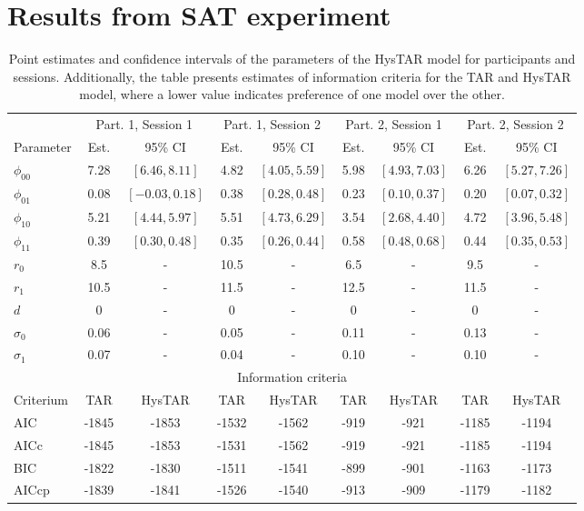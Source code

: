 \documentclass{article}
\begin{document}
\section{Results from SAT experiment}
\label{app:results_SAT}

\begin{table}[h!]
\begin{center}
\begin{tabular}{ l  c c  c c c c c c }
\hline
 & 
 \multicolumn{2}{c}{Part. 1, Session 1} 
 & \multicolumn{2}{c}{Part. 1, Session 2} 
 & \multicolumn{2}{c}{Part. 2, Session 1} 
 & \multicolumn{2}{c}{Part. 2, Session 2} \\
 \cline{2-9}
Parameter 
& Est. & 95\% CI 
& Est. & 95\% CI 
& Est. & 95\% CI 
& Est. & 95\% CI \\ 
\hline
$\phi_{00}$ 
& 7.28 & $[6.46, 8.11]$ 
& 4.82 & $[4.05, 5.59]$ 
& 5.98 & $[4.93, 7.03]$
& 6.26 & $[5.27, 7.26]$ \\
$\phi_{01}$ 
& 0.08 & $[-0.03, 0.18]$ 
& 0.38 & $[0.28, 0.48]$
& 0.23 & $[0.10, 0.37]$
& 0.20 & $[0.07, 0.32]$ \\
$\phi_{10}$ 
& 5.21 & $[4.44, 5.97]$ 
& 5.51 & $[4.73, 6.29]$
& 3.54 & $[2.68, 4.40]$
& 4.72 & $[3.96, 5.48]$ \\
$\phi_{11}$ 
& 0.39 & $[0.30, 0.48]$ 
& 0.35 & $[0.26, 0.44]$
& 0.58 & $[0.48, 0.68]$
& 0.44 & $[0.35, 0.53]$ \\
$r_0$ 
& 8.5 & - 
& 10.5 & -  
& 6.5 & -  
& 9.5 & - \\
$r_1$ 
& 10.5 & - 
& 11.5 & -
& 12.5 & -
& 11.5 & - \\
$d$ 
& 0 & - 
& 0 & -
& 0 & -
& 0 & -\\
$\sigma_0$ 
& 0.06 & - 
& 0.05 & -
& 0.11 & -
& 0.13 & - \\
$\sigma_1$ 
& 0.07 & - 
& 0.04 & - 
& 0.10 & - 
& 0.10 & - \\
\multicolumn{9}{c}{Information criteria} \\
\hline
Criterium 	& TAR 	& HysTAR 	& TAR 	& HysTAR 	& TAR 	& HysTAR 	& TAR 	& HysTAR \\
\hline
AIC 			& -1845 	& -1853 		& -1532 	& -1562 	 	& -919	& -921		& -1185	& -1194  \\
AICc 		& -1845 	& -1853 		& -1531 	& -1562 		& -919	& -921		& -1185	& -1194  \\
BIC 			& -1822 	& -1830 		& -1511	& -1541		& -899	& -901		& -1163 & -1173  \\
AICcp 		& -1839 	& -1841 		& -1526 	& -1540 	 	& -913	& -909		& -1179	& -1182  \\
\hline
\end{tabular}
\caption{Point estimates and confidence intervals of the parameters of the HysTAR model for participants and sessions. Additionally, the table presents estimates of information criteria for the TAR and HysTAR model, where a lower value indicates preference of one model over the other.}
\end{center}
\end{table}
\end{document}
